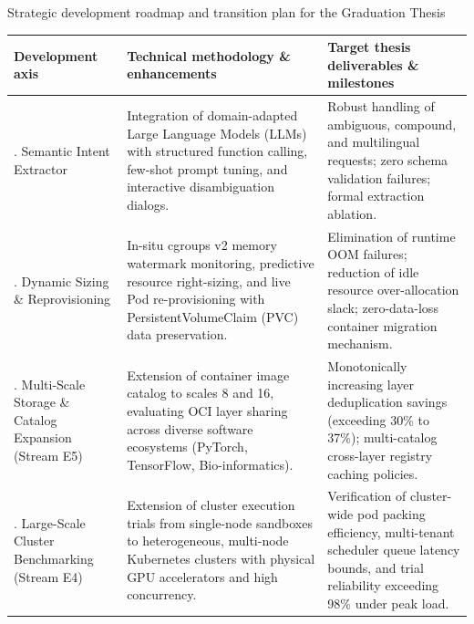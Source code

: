 \begin{table}[ht]{Strategic development roadmap and transition plan for the Graduation Thesis}
\label{tab:thesis_roadmap}
\centering
\small
\begin{tabular}{>{\raggedright\arraybackslash}p{3.0cm}>{\raggedright\arraybackslash}p{5.7cm}>{\raggedright\arraybackslash}p{5.5cm}}
\toprule
Development axis & Technical methodology \& enhancements & Target thesis deliverables \& milestones \\
\midrule
1. Semantic Intent Extractor & Integration of domain-adapted Large Language Models (LLMs) with structured function calling, few-shot prompt tuning, and interactive disambiguation dialogs. & Robust handling of ambiguous, compound, and multilingual requests; zero schema validation failures; formal extraction ablation. \\
\midrule
2. Dynamic Sizing \& Reprovisioning & In-situ cgroups v2 memory watermark monitoring, predictive resource right-sizing, and live Pod re-provisioning with PersistentVolumeClaim (PVC) data preservation. & Elimination of runtime OOM failures; reduction of idle resource over-allocation slack; zero-data-loss container migration mechanism. \\
\midrule
3. Multi-Scale Storage \& Catalog Expansion (Stream E5) & Extension of container image catalog to scales 8 and 16, evaluating OCI layer sharing across diverse software ecosystems (PyTorch, TensorFlow, Bio-informatics). & Monotonically increasing layer deduplication savings (exceeding 30\% to 37\%); multi-catalog cross-layer registry caching policies. \\
\midrule
4. Large-Scale Cluster Benchmarking (Stream E4) & Extension of cluster execution trials from single-node sandboxes to heterogeneous, multi-node Kubernetes clusters with physical GPU accelerators and high concurrency. & Verification of cluster-wide pod packing efficiency, multi-tenant scheduler queue latency bounds, and trial reliability exceeding 98\% under peak load. \\
\bottomrule
\end{tabular}
\end{table}

